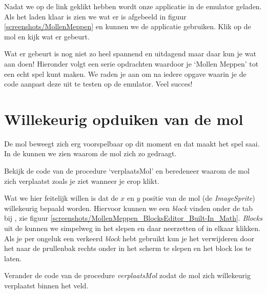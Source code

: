 
Nadat we op de link geklikt hebben wordt onze applicatie in de emulator geladen. Als het laden klaar is zien we wat er is afgebeeld in figuur \ref{screenshots/MollenMeppen} en kunnen we de applicatie gebruiken. Klik op de mol en kijk wat er gebeurt.
 
Wat er gebeurt is nog niet zo heel spannend en uitdagend maar daar kun je wat aan doen! Hieronder volgt een serie opdrachten waardoor je `Mollen Meppen' tot een echt spel kunt maken. We raden je aan om na iedere opgave waarin je de code aanpast deze uit te testen op de emulator. Veel succes!

\section{Willekeurig opduiken van de mol}
De mol beweegt zich erg voorspelbaar op dit moment en dat maakt het spel saai. In de  kunnen we zien waarom de mol zich zo gedraagt.

\begin{opgave}
    \opgVraag
	Bekijk de code van de procedure `verplaatsMol' en beredeneer waarom de mol zich verplaatst 
	zoals je ziet wanneer je erop klikt. 
\end{opgave}

Wat we hier feitelijk willen is dat de $x$ en $y$ positie van de mol (de \emph{ImageSprite}) willekeurig bepaald worden. Hiervoor kunnen we een \emph{block} vinden onder de  tab bij , zie figuur \ref{screenshots/MollenMeppen_BlocksEditor_Built-In_Math}. \emph{Blocks} uit de  kunnen we simpelweg in het  slepen en daar neerzetten of in elkaar klikken. Als je per ongeluk een verkeerd \emph{block} hebt gebruikt kun je het verwijderen door het naar de prullenbak rechts onder in het scherm te slepen en het block los te laten.


\begin{opgave}
    \opgVraag
	Verander de code van de procedure \emph{verplaatsMol} zodat de mol zich willekeurig verplaatst binnen het veld.
\end{opgave}

